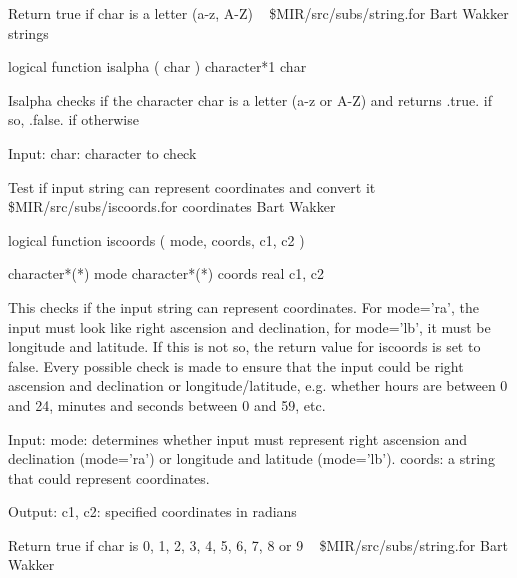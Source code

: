 %
\noindent Return true if char is a letter (a-z, A-Z)
\newline \ 
\newline {} \$MIR/src/subs/string.for
\newline {} Bart Wakker
\newline {} strings
\par{\tenpoint
{\eightpoint\begintt
      logical function isalpha ( char )
      character*1 char

 Isalpha checks if the character char is a letter (a-z or A-Z) and returns
 .true. if so, .false. if otherwise

 Input:
   char:    character to check
\endtt}
\par}
%
\noindent Test if input string can represent coordinates and convert it
\newline \ 
\newline \abox{File:} \$MIR/src/subs/iscoords.for
\newline {} coordinates
\newline \abox{Responsible:} Bart Wakker
\par{\tenpoint
{\eightpoint\begintt
      logical function iscoords ( mode, coords, c1, c2 )

      character*(*)    mode
      character*(*)    coords
      real             c1, c2

 This checks if the input string can represent coordinates. For mode='ra', the
 input must look like right ascension and declination, for mode='lb', it must
 be longitude and latitude. If this is not so, the return value for iscoords
 is set to false.
 Every possible check is made to ensure that the input could be right ascension
 and declination or longitude/latitude, e.g. whether hours are between 0 and
 24, minutes and seconds between 0 and 59, etc.

 Input:
   mode:      determines whether input must represent right ascension and
              declination (mode='ra') or longitude and latitude (mode='lb').
   coords:    a string that could represent coordinates.

 Output:
   c1, c2:    specified coordinates in radians
\endtt}
\par}
%
\noindent Return true if char is 0, 1, 2, 3, 4, 5, 6, 7, 8 or 9
\newline \ 
\newline {} \$MIR/src/subs/string.for
\newline \abox{Responsible:} Bart Wakker

